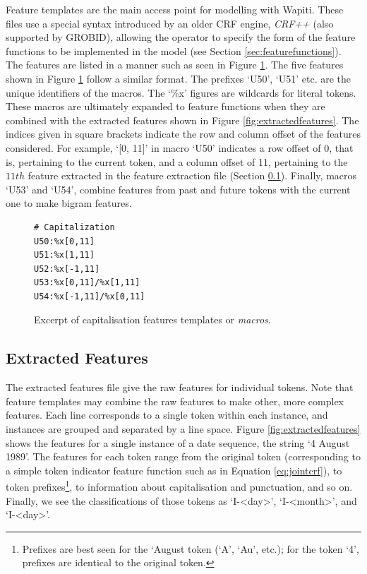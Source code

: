 Feature templates are the main access point for modelling with Wapiti. These files use a special syntax introduced by an older CRF engine, \emph{CRF++} (also supported by GROBID), allowing the operator to specify the form of the feature functions to be implemented in the model (see Section \ref{sec:featurefunctions}). The features are listed in a manner such as seen in Figure \ref{fig:featuretemplatefile}. The five features shown in Figure \ref{fig:featuretemplatefile} follow a similar format. The prefixes `U50', `U51' etc. are the unique identifiers of the macros. The `\%x' figures are wildcards for literal tokens. These macros are ultimately expanded to feature functions when they are combined with the extracted features shown in Figure \ref{fig:extractedfeatures}. The indices given in square brackets indicate the row and column offset of the features considered. For example, `[0, 11]' in macro `U50' indicates a row offset of $0$, that is, pertaining to the current token, and a column offset of 11, pertaining to the $11th$ feature extracted in the feature extraction file (Section \ref{subsec:extractedfeatures}). Finally, macros `U53' and `U54', combine features from past and future tokens with the current one to make bigram features.

\begin{figure}
\centering
\begin{BVerbatim}
# Capitalization
U50:%x[0,11]
U51:%x[1,11]
U52:%x[-1,11]
U53:%x[0,11]/%x[1,11]
U54:%x[-1,11]/%x[0,11]
\end{BVerbatim}
\caption{Excerpt of capitalisation features templates or \emph{macros}.}
\label{fig:featuretemplatefile}
\end{figure}

\subsection{Extracted Features}
\label{subsec:extractedfeatures}

The extracted features file give the raw features for individual tokens. Note that feature templates may combine the raw features to make other, more complex features. Each line corresponds to a single token within each instance, and instances are grouped and separated by a line space. Figure \ref{fig:extractedfeatures} shows the features for a single instance of a date sequence, the string `4 August 1989'. The features for each token range from the original token (corresponding to a simple token indicator feature function such as in Equation \ref{eq:jointcrf}), to token prefixes\footnote{Prefixes are best seen for the `August token (`A', `Au', etc.); for the token `4', prefixes are identical to the original token.}, to information about capitalisation and punctuation, and so on. Finally, we see the classifications of those tokens as `I-<day>', `I-<month>', and `I-<day>'.

